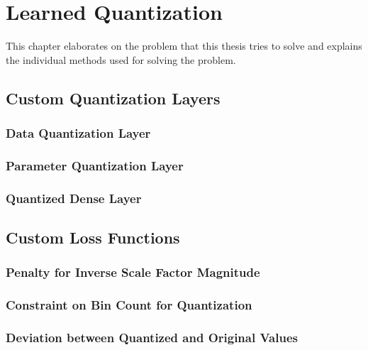 \chapter{Learned Quantization\label{cha:chapter3}}
This chapter elaborates on the problem that this thesis tries to solve and explains the individual methods used for solving the problem. 


\section{Custom Quantization Layers}
\label{sec:section1}

\subsection{Data Quantization Layer}
\label{subsec:subsection1}

\subsection{Parameter Quantization Layer}
\label{subsec:subsection2}

\subsection{Quantized Dense Layer}
\label{subsec:subsection3}

\section{Custom Loss Functions}
\label{sec:section2}

\subsection{Penalty for Inverse Scale Factor Magnitude} \label{subsec
}

\subsection{Constraint on Bin Count for Quantization} \label{subsec
}

\subsection{Deviation between Quantized and Original Values} \label{subsec
}